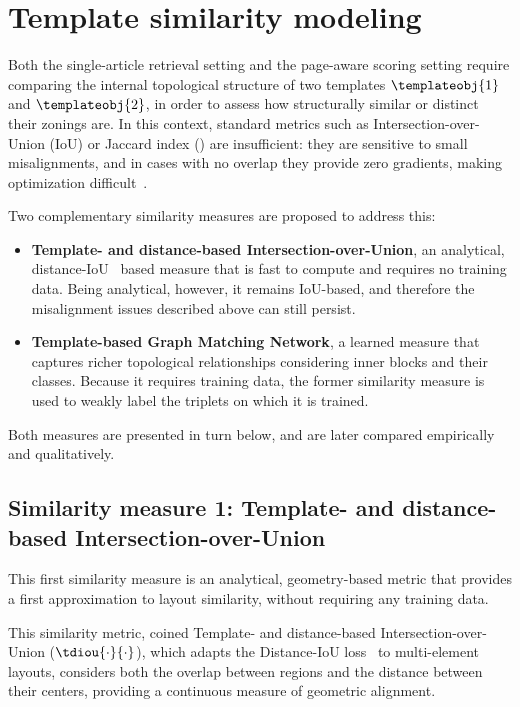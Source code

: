 \section{Template similarity modeling}
\label{section:modelling-similarity}

Both the single-article retrieval setting and the page-aware scoring setting require comparing the internal topological structure of two templates $\templateobj{1}$ and $\templateobj{2}$, in order to assess how structurally similar or distinct their zonings are. In this context, standard metrics such as Intersection-over-Union (IoU) or Jaccard index () are insufficient: they are sensitive to small misalignments, and in cases with no overlap they provide zero gradients, making optimization difficult~\cite{patil_layoutgmn_2021}. 

Two complementary similarity measures are proposed to address this:
\begin{itemize}
    \item \textbf{Template- and distance-based Intersection-over-Union}, an analytical, distance-IoU~\cite{zheng_distance-iou_2019} based measure that is fast to compute and requires no training data. Being analytical, however, it remains IoU-based, and therefore the misalignment issues described above can still persist.
    \item \textbf{Template-based Graph Matching Network}, a learned measure that captures richer topological relationships considering inner blocks and their classes. Because it requires training data, the former similarity measure is used to weakly label the triplets on which it is trained.
\end{itemize}
Both measures are presented in turn below, and are later compared empirically and qualitatively.

\subsection{Similarity measure 1: Template- and distance-based Intersection-over-Union}

This first similarity measure is an analytical, geometry-based metric that provides a first approximation to layout similarity, without requiring any training data.

This similarity metric, coined Template- and distance-based Intersection-over-Union ($\tdiou{\cdot}{\cdot}$), which adapts the Distance-IoU loss~\cite{zheng_distance-iou_2019} to multi-element layouts, considers both the overlap between regions and the distance between their centers, providing a continuous measure of geometric alignment.

